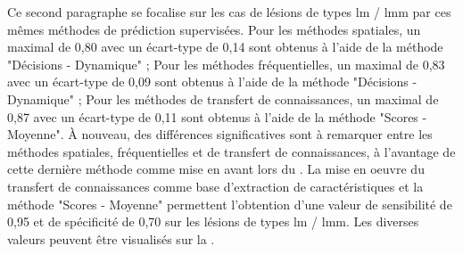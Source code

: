 Ce second paragraphe se focalise sur les cas de lésions de types \gls{lm} / \gls{lmm} par ces mêmes méthodes de prédiction supervisées. Pour les méthodes spatiales, un \fscore{} maximal de 0,80 avec un écart-type de 0,14 sont obtenus à l'aide de la méthode "Décisions - Dynamique" ; Pour les méthodes fréquentielles, un \fscore{} maximal de 0,83 avec un écart-type de 0,09 sont obtenus à l'aide de la méthode "Décisions - Dynamique" ; Pour les méthodes de transfert de connaissances, un \fscore{} maximal de 0,87 avec un écart-type de 0,11 sont obtenus à l'aide de la méthode "Scores - Moyenne". À nouveau, des différences significatives sont à remarquer entre les méthodes spatiales, fréquentielles et de transfert de connaissances, à l'avantage de cette dernière méthode comme mise en avant lors du . La mise en oeuvre du transfert de connaissances comme base d'extraction de caractéristiques et la méthode "Scores - Moyenne" permettent l'obtention d'une valeur de sensibilité de 0,95 et de spécificité de 0,70 sur les lésions de types \gls{lm} / \gls{lmm}. Les diverses valeurs peuvent être visualisés sur la .\par

